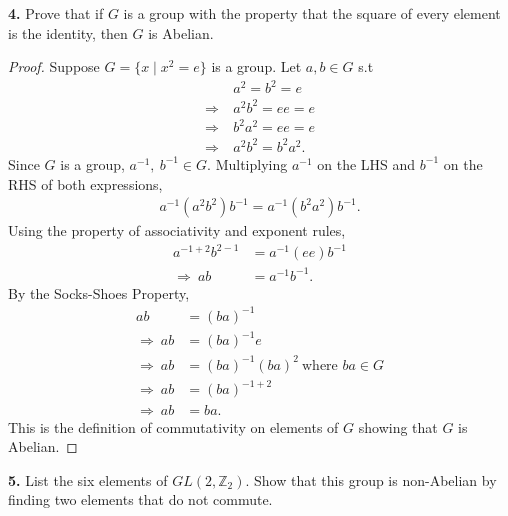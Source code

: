 \documentclass[12pt, letterpaper]{article}
\begin{document}
\vspace{0.2em}
\textbf{4.} Prove that if $G$ is a group with the property that the square of every element is the identity, then $G$ is Abelian.
\begin{proof}
    Suppose $G = \{x \mid x^{2} = e\}$ is a group. Let $a, b \in G$ s.t
    \begin{align*}
        &a^{2} = b^{2} = e \\
        \Rightarrow \ &a^2b^{2} = ee = e \\
        \Rightarrow \ &b^{2}a^{2} = ee =e \\
        \Rightarrow \ &a^{2}b^{2} = b^{2}a^{2}.
    \end{align*}
    Since $G$ is a group, $a^{-1}, \ b^{-1} \in G$. Multiplying $a^{-1}$ on the LHS and $b^{-1}$ on the RHS of both expressions,
    \begin{align*}
        a^{-1}(a^{2}b^{2})b^{-1} = a^{-1}(b^{2}a^2)b^{-1}.
    \end{align*}
    Using the property of associativity and exponent rules,
    \begin{align*}
        a^{-1 +2}b^{2 -1} &= a^{-1}(ee)b^{-1} \\
    \Rightarrow \ ab &= a^{-1}b^{-1}.
    \end{align*}
    By the Socks-Shoes Property,
    \begin{align*}
        ab& = (ba)^{-1} \\
        \Rightarrow \ ab& = (ba)^{-1}e \\
        \Rightarrow \ ab & = (ba)^{-1}(ba)^{2} \ \text{where $ba \in G$}\\
        \Rightarrow \ ab &= (ba)^{-1 + 2} \\
        \Rightarrow \ ab &= ba.
    \end{align*}
    This is the definition of commutativity on elements of $G$ showing that $G$ is Abelian.
\end{proof} 
\vspace{0.2em}
\noindent \textbf{5.} List the six elements of $GL(2, \mathbb{Z}_{2})$. Show that this group is non-Abelian by finding two elements that do not commute. 
\end{document}
